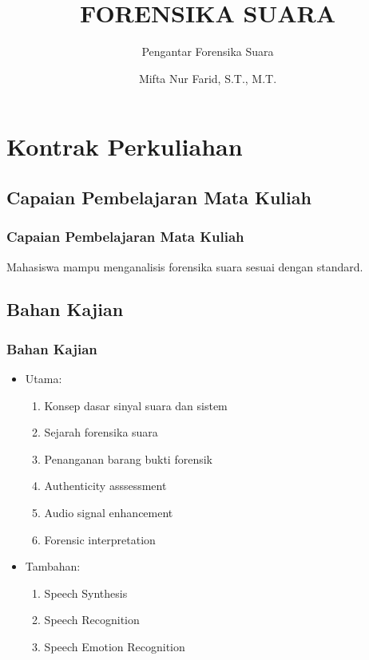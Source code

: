 \documentclass[pdflatex,compress]{beamer}
\title{FORENSIKA SUARA}
\subtitle{Pengantar Forensika Suara}
\author{Mifta Nur Farid, S.T., M.T.}
\begin{document}

\maketitle

\section{Kontrak Perkuliahan}

\subsection{Capaian Pembelajaran Mata Kuliah}

\begin{frame}
	\frametitle{Capaian Pembelajaran Mata Kuliah}
	Mahasiswa mampu menganalisis forensika suara sesuai dengan standard.
\end{frame}

\subsection{Bahan Kajian}

\begin{frame}
	\frametitle{Bahan Kajian}
	\begin{itemize}
		\item Utama:
		\begin{enumerate}
			\item Konsep dasar sinyal suara dan sistem
			\item Sejarah forensika suara
			\item Penanganan barang bukti forensik
			\item Authenticity asssessment
			\item Audio signal enhancement
			\item Forensic interpretation
		\end{enumerate}
		\item Tambahan:
		\begin{enumerate}
			\item Speech Synthesis
			\item Speech Recognition
			\item Speech Emotion Recognition
		\end{enumerate}
	\end{itemize}
\end{frame}
\end{document}

